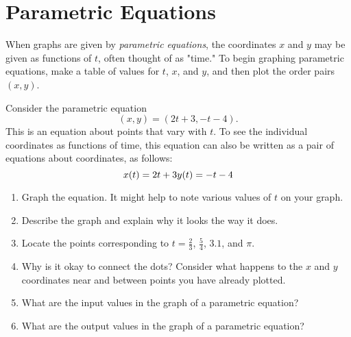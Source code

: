 
\newpage

\section{Parametric Equations}


%

When graphs are given by \emph{parametric equations}, the coordinates $x$ and $y$ may be given as functions of $t$, often thought of as "time."  To begin graphing parametric equations, make a table of values for $t$, $x$, and $y$, and then plot the order pairs $(x, y)$.  

\begin{prob}
 Consider the parametric equation $$(x,y) = (2t+3,-t-4).$$  This is an equation about points that vary with $t$.  To see the individual coordinates as functions of time, this equation can also be written as a pair of equations about coordinates, as follows:  
\begin{equation}
x(t) = 2t + 3  \\  y(t) = -t-4
\end{equation}
\begin{enumerate}
\item Graph the equation.  It might help to note various values of $t$ on your graph. 
\item Describe the graph and explain why it looks the way it does.  
\item Locate the points corresponding to $t=\frac{2}{3}$, $\frac{5}{4}$, $3.1$, and $\pi$.  
\item Why is it okay to connect the dots?  Consider what happens to the $x$ and $y$ coordinates near and between points you have already plotted.  
\item What are the input values in the graph of a parametric equation?  
\item What are the output values in the graph of a parametric equation?  
\end{enumerate}

\end{prob}


